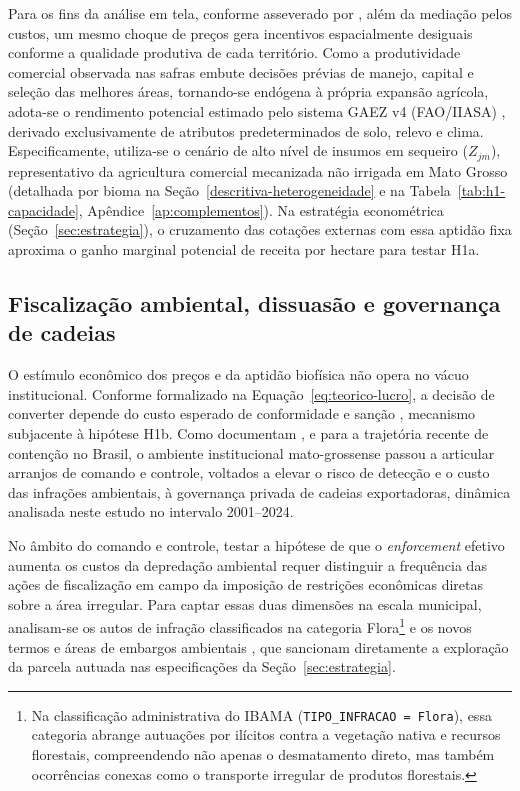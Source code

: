Para os fins da análise em tela, conforme asseverado por , além da mediação pelos custos, um mesmo choque de preços gera incentivos espacialmente desiguais conforme a qualidade produtiva de cada território. Como a produtividade comercial observada nas safras embute decisões prévias de manejo, capital e seleção das melhores áreas, tornando-se endógena à própria expansão agrícola, adota-se o rendimento potencial estimado pelo sistema GAEZ v4 (FAO/IIASA) \cite{FAOGAEZ2021}, derivado exclusivamente de atributos predeterminados de solo, relevo e clima. Especificamente, utiliza-se o cenário de alto nível de insumos em sequeiro ($Z_{jm}$), representativo da agricultura comercial mecanizada não irrigada em Mato Grosso (detalhada por bioma na Seção~\ref{descritiva-heterogeneidade} e na Tabela~\ref{tab:h1-capacidade}, Apêndice~\ref{ap:complementos}). Na estratégia econométrica (Seção~\ref{sec:estrategia}), o cruzamento das cotações externas com essa aptidão fixa aproxima o ganho marginal potencial de receita por hectare para testar H1a.

\subsection{Fiscalização ambiental, dissuasão e governança de cadeias}
\label{descritiva-instituicoes}

O estímulo econômico dos preços e da aptidão biofísica não opera no vácuo institucional. Conforme formalizado na Equação~\eqref{eq:teorico-lucro}, a decisão de converter depende do custo esperado de conformidade e sanção \cite{Shimshack2014}, mecanismo subjacente à hipótese H1b. Como documentam ,  e  para a trajetória recente de contenção no Brasil, o ambiente institucional mato-grossense passou a articular arranjos de comando e controle, voltados a elevar o risco de detecção e o custo das infrações ambientais, à governança privada de cadeias exportadoras, dinâmica analisada neste estudo no intervalo 2001--2024.

No âmbito do comando e controle, testar a hipótese de que o \textit{enforcement} efetivo aumenta os custos da depredação ambiental requer distinguir a frequência das ações de fiscalização em campo da imposição de restrições econômicas diretas sobre a área irregular. Para captar essas duas dimensões na escala municipal, analisam-se os autos de infração classificados na categoria Flora\footnote{Na classificação administrativa do IBAMA (\texttt{TIPO\_INFRACAO = Flora}), essa categoria abrange autuações por ilícitos contra a vegetação nativa e recursos florestais, compreendendo não apenas o desmatamento direto, mas também ocorrências conexas como o transporte irregular de produtos florestais.} \cite{IBAMA2026} e os novos termos e áreas de embargos ambientais \cite{IBAMAEmbargos2026}, que sancionam diretamente a exploração da parcela autuada nas especificações da Seção~\ref{sec:estrategia}.

